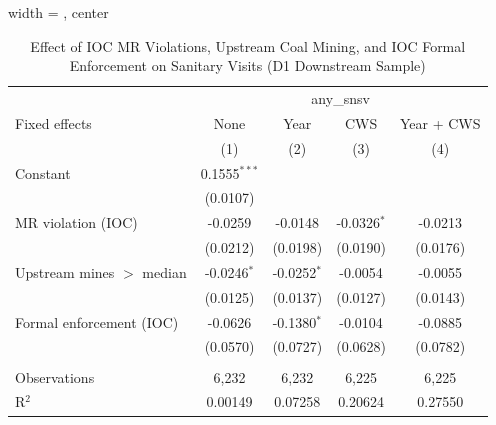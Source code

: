 
\begin{table}[htbp]
   
   \caption{\label{tab:sanitary_visit_mr_upstream_mines_ols_ioc} Effect of IOC MR Violations, Upstream Coal Mining, and IOC Formal Enforcement on Sanitary Visits (D1 Downstream Sample)}
   \bigskip
   
   \centering
   
   \begin{adjustbox}{width = \textwidth, center}
      
      
      \begin{tabular}{lcccc}
         \toprule
         
          & \multicolumn{4}{c}{any\_snsv}\\
         
         Fixed effects             & None           & Year          & CWS           & Year + CWS \\   
         
                                   & (1)            & (2)           & (3)           & (4)\\  
         
         \midrule 
         Constant                  & 0.1555$^{***}$ &               &               &   \\   
                                   & (0.0107)       &               &               &   \\   
         MR violation (IOC)        & -0.0259        & -0.0148       & -0.0326$^{*}$ & -0.0213\\   
                                   & (0.0212)       & (0.0198)      & (0.0190)      & (0.0176)\\   
         Upstream mines $>$ median & -0.0246$^{*}$  & -0.0252$^{*}$ & -0.0054       & -0.0055\\   
                                   & (0.0125)       & (0.0137)      & (0.0127)      & (0.0143)\\   
         Formal enforcement (IOC)  & -0.0626        & -0.1380$^{*}$ & -0.0104       & -0.0885\\   
                                   & (0.0570)       & (0.0727)      & (0.0628)      & (0.0782)\\   
         
          \\
         
         Observations              & 6,232          & 6,232         & 6,225         & 6,225\\  
         R$^2$                     & 0.00149        & 0.07258       & 0.20624       & 0.27550\\  
         

\end{tabular}
\end{adjustbox}
\end{table}
